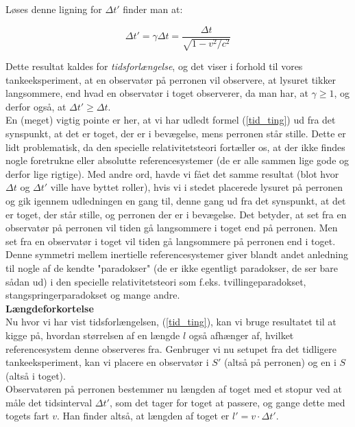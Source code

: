 Løses denne ligning for $\Delta t'$ finder man at:

\begin{equation}
\Delta t' = \gamma \Delta t = \frac{\Delta t}{\sqrt{1 - v^2 / c^2}}
\label{tid_ting}
\end{equation}

\vspace{2mm}



Dette resultat kaldes for \emph{tidsforlængelse}, og det viser i forhold til vores tankeeksperiment, at en observatør på perronen vil observere, at lysuret tikker langsommere, end hvad en observatør i toget observerer, da man har, at $\gamma \geq 1$, og derfor også, at $\Delta t' \geq \Delta t$.\\

En (meget) vigtig pointe er her, at vi har udledt formel (\ref{tid_ting}) ud fra det synspunkt, at det er toget, der er i bevægelse, mens perronen står stille. Dette er lidt problematisk, da den specielle relativitetsteori fortæller os, at der ikke findes nogle foretrukne eller absolutte referencesystemer (de er alle sammen lige gode og derfor lige rigtige). Med andre ord, havde vi fået det samme resultat (blot hvor $\Delta t$ og $\Delta t'$ ville have byttet roller), hvis vi i stedet placerede lysuret på perronen og gik igennem udledningen en gang til, denne gang ud fra det synspunkt, at det er toget, der står stille, og perronen der er i bevægelse. Det betyder, at set fra en observatør på perronen vil tiden gå langsommere i toget end på perronen. Men set fra en observatør i toget vil tiden gå langsommere på perronen end i toget. Denne symmetri mellem inertielle referencesystemer giver blandt andet anledning til nogle af de kendte "paradokser" (de er ikke egentligt paradokser, de ser bare sådan ud) i den specielle relativitetsteori som f.eks. tvillingeparadokset, stangspringerparadokset og mange andre.\\

\noindent
\textbf{Længdeforkortelse}\\


Nu hvor vi har vist tidsforlængelsen, (\ref{tid_ting}), kan vi bruge resultatet til at kigge på, hvordan størrelsen af en længde $l$ også afhænger af, hvilket referencesystem denne observeres fra. Genbruger vi nu setupet fra det tidligere tankeeksperiment, kan vi placere en observatør i $S'$ (altså på perronen) og en i $S$ (altså i toget).\\

Observatøren på perronen bestemmer nu længden af toget med et stopur ved at måle det tidsinterval $\Delta t'$, som det tager for toget at passere, og gange dette med togets fart $v$. Han finder altså, at længden af toget er $l' = v \cdot \Delta t'$.\\

